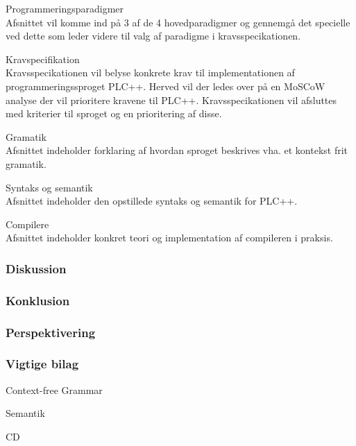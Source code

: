 \begin{itemize_small}
    \item Programmeringsparadigmer\\
    Afsnittet vil komme ind på 3 af de 4 hovedparadigmer og gennemgå det specielle ved dette som leder videre til valg af paradigme i kravsspecikationen.
    \item Kravspecifikation\\
    Kravsspecikationen vil belyse konkrete krav til implementationen af programmeringssproget PLC++. Herved vil der ledes over på en MoSCoW analyse der vil prioritere kravene til PLC++. Kravsspecikationen vil afsluttes med kriterier til sproget og en prioritering af disse.
    \item Gramatik\\ Afsnittet indeholder forklaring af hvordan sproget beskrives vha. et kontekst frit gramatik.
    \item Syntaks og semantik\\
    Afsnittet indeholder den opstillede syntaks og semantik for PLC++.
    \item Compilere\\
    Afsnittet indeholder konkret teori og implementation af compileren i praksis.
\end{itemize_small}

\subsubsection*{Diskussion}

\subsubsection*{Konklusion}

\subsubsection*{Perspektivering}

\subsubsection*{Vigtige bilag}
\begin{itemize_small}
    \item Context-free Grammar
    \item Semantik
    \item CD
\end{itemize_small}

